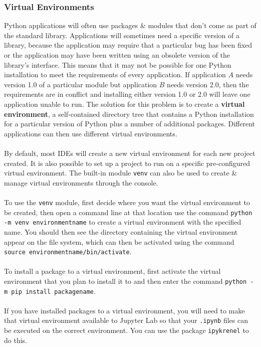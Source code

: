 \documentclass[a4paper,11pt]{article}
\begin{document}
\subsubsection{Virtual Environments}
Python applications will often use packages \& modules that don't come as part of the standard library.
Applications will sometimes need a specific version of a library, because the application may require that a 
particular bug has been fixed or the application may have been written using an obsolete version of the library's
interface.
This means that it may not be possible for one Python installation to meet the requirements of every application.
If application $A$ needs version 1.0 of a particular module but application $B$ needs version 2.0, then the 
requirements are in conflict and installing either version 1.0 or 2.0 will leave one application unable to run.
The solution for this problem is to create a \textbf{virtual environment}, a self-contained directory tree that
contains a Python installation for a particular version of Python plus a number of additional packages.
Different applications can then use different virtual environments.
\\\\
By default, most IDEs will create a new virtual environment for each new project created.
It is also possible to set up a project to run on a specific pre-configured virtual environment.
The built-in module \texttt{venv} can also be used to create \& manage virtual environments through
the console.
\\\\
To use the \texttt{venv} module, first decide where you want the virtual environment to be created,
then open a command line at that location use the command \texttt{python -m venv environmentname} to
create a virtual environment with the specified name.
You should then see the directory containing the virtual environment appear on the file system, which can then be
activated using the command \texttt{source environmentname/bin/activate}.
\\\\
To install a package to a virtual environment, first activate the virtual environment that you plan to install it to
and then enter the command \texttt{python -m pip install packagename}.
\\\\
If you have installed packages to a virtual environment, you will need to make that virtual environment available
to Jupyter Lab so that your \verb|.ipynb| files can be executed on the correct environment.
You can use the package \verb|ipykrenel| to do this.
\end{document}
